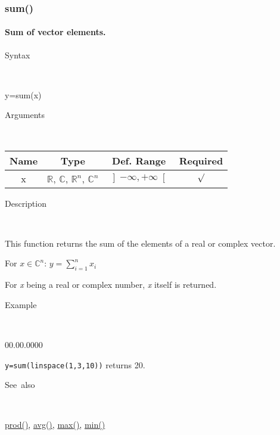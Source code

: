 \newpage
\subsubsection*{\hypertarget{sum}{}{\Large sum()}}


\paragraph{\label{par:Sum}Sum of vector elements.}

\begin{description}
\item [Syntax]~
\end{description}
y=sum(x)

\begin{description}
\item [Arguments]~
\end{description}
\begin{tabular}{|c|c|c|c|}
\hline 
Name&
Type&
Def. Range&
Required\tabularnewline
\hline
\hline 
x&
$\mathbb{R}$, $\mathbb{C}$, $\mathbb{R}^{n}$, $\mathbb{C}^{n}$&
$\left]-\infty,+\infty\right[$&
$\surd$\tabularnewline
\hline
\end{tabular}

\begin{description}
\item [Description]~
\end{description}
This function returns the sum of the elements of a real or complex
vector.

\medskip{}
For $x\in$$\mathbb{C}^{n}$: $y=$$\sum\limits _{i=1}^{n}x_{i}$
\medskip{}

For \textit{x} being a real or complex number, \textit{x} itself is
returned.

\begin{description}
\item [Example]~
\end{description}
\begin{lyxlist}{00.00.0000}
\item [\texttt{y=sum(linspace(1,3,10))}]returns 20.
\end{lyxlist}
\begin{description}
\item [See~also]~
\end{description}
\textcolor{blue}{\hyperlink{prod}{prod()}}\textcolor{black}{,} \textcolor{blue}{\hyperlink{avg}{avg()}}\textcolor{black}{,}
\textcolor{blue}{\hyperlink{max}{max()}}\textcolor{black}{,} \textcolor{blue}{\hyperlink{min}{min()}}


